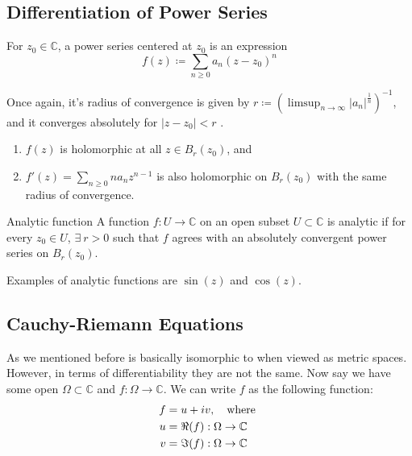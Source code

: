 \documentclass{article}
\begin{document}
\subsection{Differentiation of Power Series}

For \( z_0 \in \mathbb{C}  \), a power series centered at \( z_0 \) is an expression
\[
    f(z) \coloneqq \sum_{n\geq 0} a_{n}(z - z_0)^n 
\]

Once again, it's radius of convergence is given by \( r\coloneqq (\limsup_{n \to \infty} |a_{n} |^\frac{1}{n})^{-1} \), and it converges absolutely for \( |z - z_0| < r \) .

\begin{thrm}{}{}
\begin{enumerate}[]
    \item $f(z)$ is holomorphic at all \( z \in  B_{r} (z_0) \), and 
    \item \( f'(z) = \sum_{n\geq 0} na_{n} z^{n- 1}   \) is also holomorphic on \( B_{r} (z_0) \) with the same radius of convergence. 
\end{enumerate}
\end{thrm}

\begin{defn}{Analytic function}{}
A function \( f: U \to \mathbb{C}  \) on an open subset \( U \subset \mathbb{C}  \) is analytic if for every \( z_0 \in  U \), \( \exists \ r>0  \) such that \( f \) agrees with an absolutely convergent power series on \( B_{r} (z_0) \). 
\end{defn}

Examples of analytic functions are \( \sin (z) \) and \( \cos (z) \). 

\subsection{Cauchy-Riemann Equations}

As we mentioned before \C{} is basically isomorphic to  when viewed as metric spaces. However, in terms of differentiability they are not the same. Now say we have some open \( \Omega \subset \mathbb{C} \) and \( f: \Omega \to \mathbb{C}  \). We can write \( f \) as the following function:
\begin{align*}
    f &= u + iv, \text{\quad where } \\ 
    u &= \Re (f): \Omega \to \mathbb{C} \\
    v &= \Im (f): \Omega \to \mathbb{C} 
\end{align*}
\end{document}
